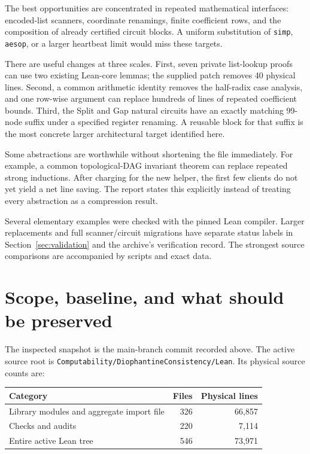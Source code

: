 \documentclass[11pt,letterpaper]{article}
\newcommand{\code}[1]{\nolinkurl{#1}}
\begin{document}
The best opportunities are concentrated in repeated mathematical interfaces:
encoded-list scanners, coordinate renamings, finite coefficient rows, and the
composition of already certified circuit blocks. A uniform substitution of
\code{simp}, \code{aesop}, or a larger heartbeat limit would miss these targets.

There are useful changes at three scales. First, seven private list-lookup
proofs can use two existing Lean-core lemmas; the supplied patch removes
40 physical lines. Second, a common arithmetic identity removes the
half-radix case analysis, and one row-wise argument can replace hundreds of
lines of repeated coefficient bounds. Third, the Split and Gap natural
circuits have an exactly matching 99-node suffix under a specified register
renaming. A reusable block for that suffix is the most concrete larger
architectural target identified here.

Some abstractions are worthwhile without shortening the file immediately.
For example, a common topological-DAG invariant theorem can replace repeated
strong inductions. After charging for the new helper, the first few clients
do not yet yield a net line saving. The report states this explicitly instead
of treating every abstraction as a compression result.

Several elementary examples were checked with the pinned Lean compiler.
Larger replacements and full scanner/circuit migrations have separate status
labels in Section~\ref{sec:validation} and the archive's verification record.
The strongest source comparisons are accompanied by scripts and exact data.

\newpage
\tableofcontents
\newpage

\section{Scope, baseline, and what should be preserved}
\label{sec:scope}

The inspected snapshot is the main-branch commit recorded above. The active
source root is \code{Computability/DiophantineConsistency/Lean}. Its physical
source counts are:

\begin{center}
\begin{tabular}{lrr}
\toprule
Category & Files & Physical lines\\
\midrule
Library modules and aggregate import file & 326 & 66,857\\
Checks and audits & 220 & 7,114\\
Entire active Lean tree & 546 & 73,971\\
\bottomrule
\end{tabular}
\end{center}
\end{document}
